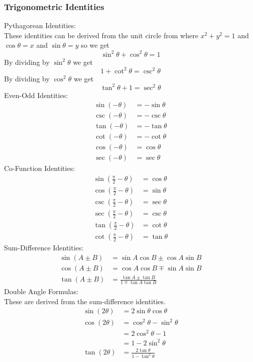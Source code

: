 \documentclass[11pt, fleqn]{article}
\begin{document}
\subsubsection{Trigonometric Identities}
Pythagorean Identities:\\
These identities can be derived from the unit circle from where $x^2+y^2=1$ and $\cos\theta = x$ and $\sin\theta=y$ so we get
$$\sin^2\theta+\cos^2\theta=1$$
By dividing by $\sin^2\theta$ we get
$$1+\cot^2\theta=\csc^2\theta$$
By dividing by $\cos^2\theta$ we get 
$$\tan^2\theta+1=\sec^2\theta$$
Even-Odd Identities:
\begin{align*}
    \sin(-\theta)&=-\sin\theta\\
    \csc(-\theta)&=-\csc\theta\\
    \tan(-\theta)&=-\tan\theta\\
    \cot(-\theta)&=-\cot\theta\\
    \cos(-\theta)&=\cos\theta\\
    \sec(-\theta)&=\sec\theta
\end{align*}
Co-Function Identities:
\begin{align*}
    \sin\left(\frac{\pi}{2}-\theta\right)&=\cos\theta\\
    \cos\left(\frac{\pi}{2}-\theta\right)&=\sin\theta\\
    \csc\left(\frac{\pi}{2}-\theta\right)&=\sec\theta\\
    \sec\left(\frac{\pi}{2}-\theta\right)&=\csc\theta\\
    \tan\left(\frac{\pi}{2}-\theta\right)&=\cot\theta\\
    \cot\left(\frac{\pi}{2}-\theta\right)&=\tan\theta
\end{align*}
Sum-Difference Identities:
\begin{align*}
    \sin(A\pm B)&=\sin A\cos B\pm \cos A\sin B\\
    \cos(A\pm B)&=\cos A\cos B\mp \sin A\sin B\\
    \tan(A\pm B)&=\frac{\tan A\pm \tan B}{1\mp\tan A\tan B}
\end{align*}
Double Angle Formulas:\\
These are derived from the sum-difference identities.
\begin{align*}
    \sin(2\theta)&=2\sin\theta\cos\theta\\
    \cos(2\theta)&=\cos^2\theta-\sin^2\theta\\
    &=2\cos^2\theta-1\\
    &=1-2\sin^2\theta\\
    \tan(2\theta)&=\frac{2\tan\theta}{1-\tan^2\theta}
\end{align*}
\end{document}
